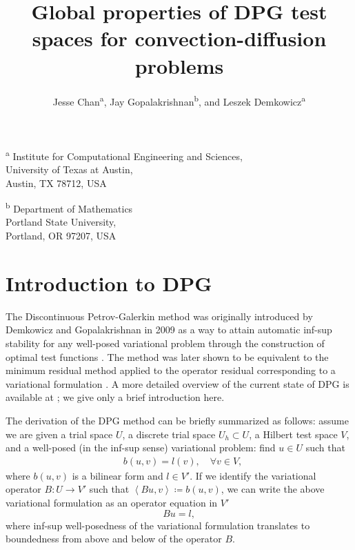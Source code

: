 \documentclass[11pt,onecolumn]{scrartcl}
\author{Jesse Chan\textsuperscript{a}, Jay Gopalakrishnan\textsuperscript{b}, and Leszek Demkowicz\textsuperscript{a}}
\title{Global properties of DPG test spaces for convection-diffusion problems}
\date{}
\newcommand{\LRa}[1]{\left\langle #1 \right\rangle}
\begin{document}
\maketitle
\begin{center}
\textsuperscript{a} Institute for Computational Engineering and Sciences, \\University of Texas at Austin, \\Austin, TX 78712, USA\\
\end{center}

\begin{center}
\textsuperscript{b} Department of Mathematics\\Portland State University, \\
Portland, OR 97207, USA
\end{center}


\section{Introduction to DPG}

The Discontinuous Petrov-Galerkin method was originally introduced by Demkowicz and Gopalakrishnan in 2009 as a way to attain automatic inf-sup stability for any well-posed variational problem through the construction of optimal test functions \cite{DPG2}.  The method was later shown to be equivalent to the minimum residual method applied to the operator residual corresponding to a variational formulation \cite{DPG2, ChanHeuerBui-ThanhDemkowicz12}.  A more detailed overview of the current state of DPG is available at \cite{overviewDPG}; we give only a brief introduction here.

The derivation of the DPG method can be briefly summarized as follows: assume we are given a trial space $U$, a discrete trial space $U_h \subset U$, a Hilbert test space $V$, and a well-posed (in the inf-sup sense) variational problem: find $u\in U$  such that
\begin{align}
\label{variational}
&b(u,v) = l(v), \quad \forall v\in V, 
\end{align}
where $b(u,v)$ is a bilinear form and $l \in V'$. If we identify the variational operator $B: U\rightarrow V'$ such that $\LRa{Bu,v} \coloneqq b(u,v)$, we can write the above variational formulation as an operator equation in $V'$
\[
Bu = l,
\]
where inf-sup well-posedness of the variational formulation translates to boundedness from above and below of the operator $B$.  
\end{document}

